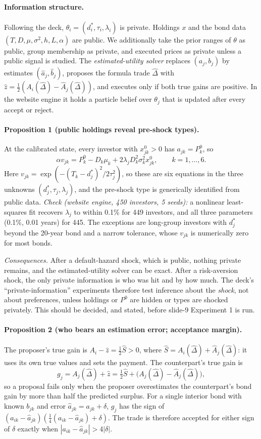 \paragraph{Information structure.}
Following the deck, $\theta_i=(d_i^*,\tau_i,\lambda_i)$ is private. Holdings $x$ and the bond data $(T,D,\mu,\sigma^2,h,L,\alpha)$ are public. We additionally take the prior ranges of $\theta$ as public, group membership as private, and executed prices as private unless a public signal is studied. The \emph{estimated-utility solver} replaces $(a_j,b_j)$ by estimates $(\hat a_j,\hat b_j)$, proposes the formula trade $\hat\Delta$ with $\hat z=\frac12(A_i(\hat\Delta)-\hat A_j(\hat\Delta))$, and executes only if both true gains are positive. In the website engine it holds a particle belief over $\theta_j$ that is updated after every accept or reject.

\paragraph{Proposition 1 (public holdings reveal pre-shock types).}
At the calibrated state, every investor with $x^0_{jk}>0$ has $a_{jk}=P^0_k$, so
\[
\alpha v_{jk}=P^0_k-D_k\mu_k+2\lambda_jD_k^2\sigma_k^2x^0_{jk},\qquad k=1,\dots,6.
\]
Here $v_{jk}=\exp(-(T_k-d_j^*)^2/2\tau_j^2)$, so these are six equations in the three unknowns $(d_j^*,\tau_j,\lambda_j)$, and the pre-shock type is generically identified from public data. \emph{Check (website engine, 450 investors, 5 seeds):} a nonlinear least-squares fit recovers $\lambda_j$ to within 0.1\% for 449 investors, and all three parameters (0.1\%, 0.01 years) for 445. The exceptions are long-group investors with $d^*_j$ beyond the 20-year bond and a narrow tolerance, whose $v_{jk}$ is numerically zero for most bonds.

\emph{Consequences.} After a default-hazard shock, which is public, nothing private remains, and the estimated-utility solver can be exact. After a risk-aversion shock, the only private information is who was hit and by how much. The deck's ``private-information'' experiments therefore test inference about the \emph{shock}, not about preferences, unless holdings or $P^0$ are hidden or types are shocked privately. This should be decided, and stated, before slide-9 Experiment 1 is run.

\paragraph{Proposition 2 (who bears an estimation error; acceptance margin).}
The proposer's true gain is $A_i-\hat z=\frac12\hat S>0$, where $\hat S=A_i(\hat\Delta)+\hat A_j(\hat\Delta)$: it uses its own true values and sets the payment. The counterpart's true gain is
\[
g_j=A_j(\hat\Delta)+\hat z=\tfrac12\hat S+\bigl(A_j(\hat\Delta)-\hat A_j(\hat\Delta)\bigr),
\]
so a proposal fails only when the proposer overestimates the counterpart's bond gain by more than half the predicted surplus. For a single interior bond with known $b_{jk}$ and error $\hat a_{jk}=a_{jk}+\delta$, $g_j$ has the sign of $(a_{ik}-\hat a_{jk})(\frac14(a_{ik}-\hat a_{jk})+\delta)$. The trade is therefore accepted for either sign of $\delta$ exactly when $|a_{ik}-\hat a_{jk}|>4|\delta|$.

